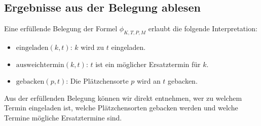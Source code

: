 \documentclass[12pt,a4paper]{article}
\begin{document}
\subsection*{Ergebnisse aus der Belegung ablesen}
Eine erfüllende Belegung der Formel $\phi_{K,T,P,M}$ erlaubt die folgende Interpretation:
\begin{itemize}
   \item $\text{eingeladen}(k, t)$: $k$ wird zu $t$ eingeladen.
   \item $\text{ausweichtermin}(k, t)$: $t$ ist ein möglicher Ersatztermin für $k$.
   \item $\text{gebacken}(p, t)$: Die Plätzchensorte $p$ wird an $t$ gebacken.
\end{itemize}

Aus der erfüllenden Belegung können wir direkt entnehmen, wer zu welchem Termin eingeladen ist, welche Plätzchensorten gebacken werden und welche Termine mögliche Ersatztermine sind.
\end{document}
